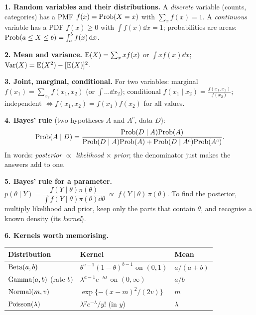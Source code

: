 \documentclass[11pt]{article}
\begin{document}
\begin{recall}
\textbf{1. Random variables and their distributions.}
A \emph{discrete} variable (counts, categories) has a PMF $f(x)=\mathrm{Prob}(X=x)$ with $\sum_xf(x)=1$.
A \emph{continuous} variable has a PDF $f(x)\ge0$ with $\int f(x)\dd x=1$; probabilities are areas: $\mathrm{Prob}(a\le X\le b)=\int_a^bf(x)\,\mathrm{d} x$.

\medskip
\textbf{2. Mean and variance.}
$\mathrm{E}(X)=\sum_x xf(x)$ or $\int xf(x)\dd x$; \quad $\mathrm{Var}(X)=\mathrm{E}(X^2)-[\mathrm{E}(X)]^2$.

\medskip
\textbf{3. Joint, marginal, conditional.}
For two variables: marginal $f(x_1)=\sum_{x_2}f(x_1,x_2)$ (or $\int\dots\dd x_2$); conditional $f(x_1\mid x_2)=\frac{f(x_1,x_2)}{f(x_2)}$; independent $\iff f(x_1,x_2)=f(x_1)f(x_2)$ for all values.

\medskip
\textbf{4. Bayes' rule} (two hypotheses $A$ and $A^c$, data $D$):
\[
\mathrm{Prob}(A\mid D)=\frac{\mathrm{Prob}(D\mid A)\mathrm{Prob}(A)}{\mathrm{Prob}(D\mid A)\mathrm{Prob}(A)+\mathrm{Prob}(D\mid A^c)\mathrm{Prob}(A^c)}.
\]
In words: \emph{posterior} $\propto$ \emph{likelihood} $\times$ \emph{prior}; the denominator just makes the answers add to one.

\medskip
\textbf{5. Bayes' rule for a parameter.}
$p(\theta\mid Y)=\dfrac{f(Y\mid\theta)\pi(\theta)}{\int f(Y\mid\theta)\pi(\theta)\dd\theta}\ \propto\ f(Y\mid\theta)\,\pi(\theta)$.
To find the posterior, multiply likelihood and prior, keep only the parts that contain $\theta$, and recognise a known density (its \emph{kernel}).

\medskip
\textbf{6. Kernels worth memorising.}
\begin{center}
\begin{tabular}{lll}\toprule
Distribution & Kernel & Mean\\\midrule
$\mathrm{Beta}(a,b)$ & $\theta^{a-1}(1-\theta)^{b-1}$ on $(0,1)$ & $a/(a+b)$\\
$\mathrm{Gamma}(a,b)$ (rate $b$) & $\lambda^{a-1}e^{-b\lambda}$ on $(0,\infty)$ & $a/b$\\
$\mathrm{Normal}(m,v)$ & $\exp\{-(x-m)^2/(2v)\}$ & $m$\\
$\mathrm{Poisson}(\lambda)$ & $\lambda^ye^{-\lambda}/y!$ (in $y$) & $\lambda$\\\bottomrule
\end{tabular}
\end{center}
\end{recall}

\clearpage

\end{document}
